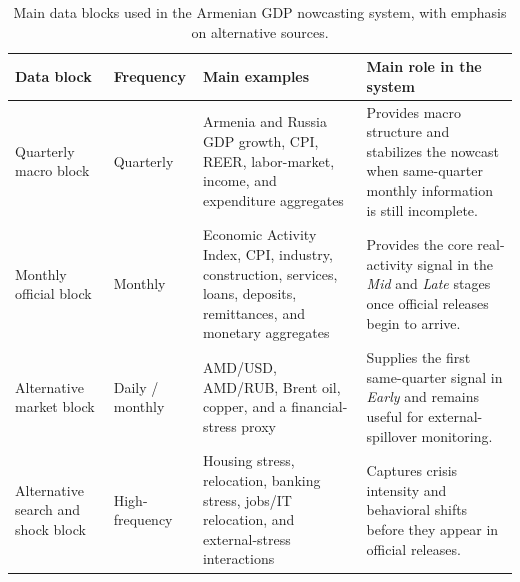 \documentclass[12pt,a4paper]{article}
\begin{document}
\begin{table}[H]
    \centering
    \footnotesize
    \setlength{\tabcolsep}{4pt}
    \caption{Main data blocks used in the Armenian GDP nowcasting system, with emphasis on alternative sources.}
    \label{tab:data_blocks_used}
    \begin{tabularx}{\textwidth}{@{}>{\raggedright\arraybackslash}p{2.15cm}>{\raggedright\arraybackslash}p{1.45cm}YY@{}}
        \toprule
        Data block & Frequency & Main examples & Main role in the system \\
        \midrule
        Quarterly macro block & Quarterly & Armenia and Russia GDP growth, CPI, REER, labor-market, income, and expenditure aggregates & Provides macro structure and stabilizes the nowcast when same-quarter monthly information is still incomplete. \\
        Monthly official block & Monthly & Economic Activity Index, CPI, industry, construction, services, loans, deposits, remittances, and monetary aggregates & Provides the core real-activity signal in the \textit{Mid} and \textit{Late} stages once official releases begin to arrive. \\
        Alternative market block & Daily / monthly & AMD/USD, AMD/RUB, Brent oil, copper, and a financial-stress proxy & Supplies the first same-quarter signal in \textit{Early} and remains useful for external-spillover monitoring. \\
        Alternative search and shock block & High-frequency & Housing stress, relocation, banking stress, jobs/IT relocation, and external-stress interactions & Captures crisis intensity and behavioral shifts before they appear in official releases. \\
        \bottomrule
    \end{tabularx}
\end{table}
\end{document}
